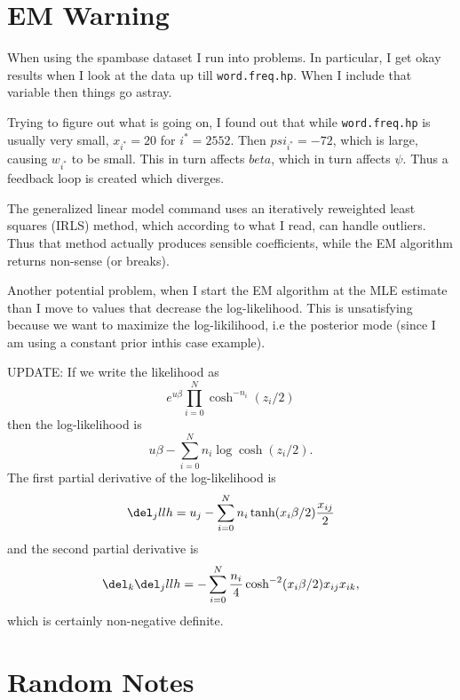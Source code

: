 \documentclass[draft]{article}
\begin{document}

\section{EM Warning}

When using the spambase dataset I run into problems.  In particular, I get okay
results when I look at the data up till \texttt{word.freq.hp}.  When I include
that variable then things go astray.

Trying to figure out what is going on, I found out that while
\texttt{word.freq.hp} is usually very small, $x_{i^*} = 20$ for $i^*=2552$.
Then $psi_{i^*} = -72$, which is large, causing $w_{i^*}$ to be small.  This in
turn affects $beta$, which in turn affects $\psi$.  Thus a feedback loop is
created which diverges.

The generalized linear model command uses an iteratively reweighted least
squares (IRLS) method, which according to what I read, can handle outliers.
Thus that method actually produces sensible coefficients, while the EM algorithm
returns non-sense (or breaks).

Another potential problem, when I start the EM algorithm at the MLE estimate
than I move to values that decrease the log-likelihood.  This is unsatisfying
because we want to maximize the log-likilihood, i.e the posterior mode (since I
am using a constant prior inthis case example).

UPDATE: If we write the likelihood as
\[
e^{u\beta} \prod_{i=0}^N \cosh^{-n_i}(z_i/2)
\]
then the log-likelihood is
\[
u \beta - \sum_{i=0}^N n_i \log \cosh (z_i/2).
\]
The first partial derivative of the log-likelihood is
\[
\del_j llh = u_j - \sum_{i=0}^N n_i \tanh(x_i \beta/2) \frac{x_{ij}}{2}
\]
and the second partial derivative is
\[
\del_k \del_j llh = - \sum_{i=0}^N \frac{n_i}{4} \cosh^{-2}(x_i \beta/2) x_{ij} x_{ik},
\]
which is certainly non-negative definite.

\section{Random Notes}
\end{document}
